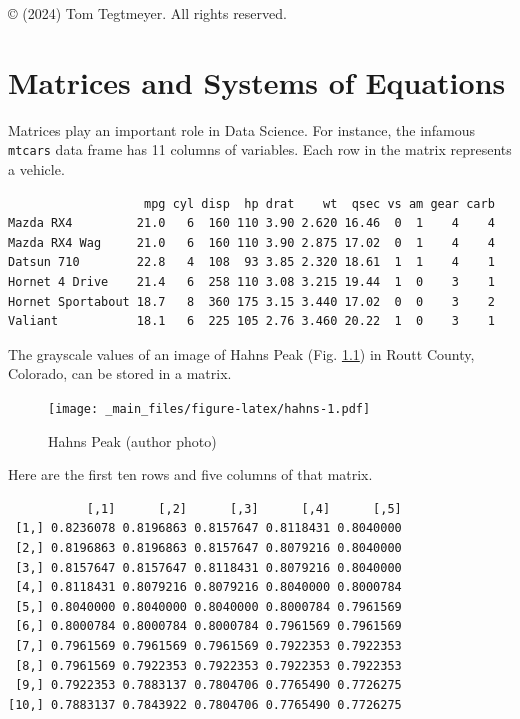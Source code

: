 \documentclass[
]{book}
\theoremstyle{definition}
\theoremstyle{definition}
\theoremstyle{definition}
\theoremstyle{definition}
\theoremstyle{remark}
\begin{document}
\pagebreak

© (2024) Tom Tegtmeyer. All rights reserved.

\setcounter{tocdepth}{1}
\tableofcontents

\mainmatter

\chapter{Matrices and Systems of Equations}\label{matrices-and-systems-of-equations}

Matrices play an important role in Data Science. For instance, the infamous \texttt{mtcars} data frame has 11 columns of variables. Each row in the matrix represents a vehicle.

\begin{verbatim}
                   mpg cyl disp  hp drat    wt  qsec vs am gear carb
Mazda RX4         21.0   6  160 110 3.90 2.620 16.46  0  1    4    4
Mazda RX4 Wag     21.0   6  160 110 3.90 2.875 17.02  0  1    4    4
Datsun 710        22.8   4  108  93 3.85 2.320 18.61  1  1    4    1
Hornet 4 Drive    21.4   6  258 110 3.08 3.215 19.44  1  0    3    1
Hornet Sportabout 18.7   8  360 175 3.15 3.440 17.02  0  0    3    2
Valiant           18.1   6  225 105 2.76 3.460 20.22  1  0    3    1
\end{verbatim}

The grayscale values of an image of Hahns Peak (Fig. \ref{fig:hahns}) in Routt County, Colorado, can be stored in a matrix.

\begin{figure}
\centering
\texttt{[image: \_main\_files/figure-latex/hahns-1.pdf]}
\caption{\label{fig:hahns}Hahns Peak (author photo)}
\end{figure}

Here are the first ten rows and five columns of that matrix.

\begin{verbatim}
           [,1]      [,2]      [,3]      [,4]      [,5]
 [1,] 0.8236078 0.8196863 0.8157647 0.8118431 0.8040000
 [2,] 0.8196863 0.8196863 0.8157647 0.8079216 0.8040000
 [3,] 0.8157647 0.8157647 0.8118431 0.8079216 0.8040000
 [4,] 0.8118431 0.8079216 0.8079216 0.8040000 0.8000784
 [5,] 0.8040000 0.8040000 0.8040000 0.8000784 0.7961569
 [6,] 0.8000784 0.8000784 0.8000784 0.7961569 0.7961569
 [7,] 0.7961569 0.7961569 0.7961569 0.7922353 0.7922353
 [8,] 0.7961569 0.7922353 0.7922353 0.7922353 0.7922353
 [9,] 0.7922353 0.7883137 0.7804706 0.7765490 0.7726275
[10,] 0.7883137 0.7843922 0.7804706 0.7765490 0.7726275
\end{verbatim}
\end{document}
